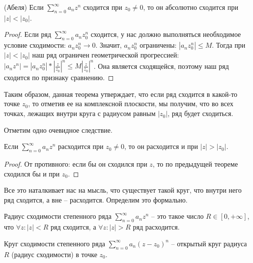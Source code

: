 \vspace*{5mm}

\begin{theorem} (Абеля)
    Если $\sum\limits_{n=0}^\infty a_n z^n$ сходится при $z_0 \neq 0$, то он абсолютно сходится при $|z| < |z_0|$.    
\end{theorem}
\begin{proof}
    Если ряд $\sum\limits_{n=0}^\infty a_n z_0^n$ сходится, у нас должно выполняться необходимое условие сходимости: $a_nz_0^n \to 0$.
    Значит, $a_nz_0^n$ ограничены: $|a_nz_0^n| \leqslant M$. 
    Тогда при $|z| < |z_0|$ наш ряд ограничен геометрической прогрессией: $|a_nz^n| = |a_nz_0^n| * |\frac{z}{z_0}|^n \leqslant M|\frac{z}{z_0}|^n$.
    Она является сходящейся, поэтому наш ряд сходится по признаку сравнению.
\end{proof}

Таким образом, данная теорема утверждает, что если ряд сходится в какой-то точке $z_0$, то отметив ее на комплексной плоскости, мы получим, что во всех точках, лежащих внутри круга с радиусом равным $|z_0|$, ряд будет сходиться.

Отметим одно очевидное следствие.

\begin{follow}
    Если $\sum\limits_{n=0}^\infty a_n z^n$ расходится при $z_0 \neq 0$, то он расходится и при $|z| > |z_0|$.
\end{follow}
\begin{proof}
    От противного: если бы он сходился при $z$, то по предыдущей теореме сходился бы и при $z_0$.
\end{proof}

\vspace*{5mm}

Все это наталкивает нас на мысль, что существует такой круг, что внутри него ряд сходится, а вне -- расходится.
Определим это формально.

\begin{conj}
    Радиус сходимости степенного ряда $\sum\limits_{n=0}^\infty a_n z^n$ -- это такое число $R \in [0, +\infty]$, что $\forall z : |z| < R$ ряд сходится, а $\forall z : |z| > R$ ряд расходится.
\end{conj}

\begin{conj}
    Круг сходимости степенного ряда $\sum\limits_{n=0}^\infty a_n (z - z_0)^n$ -- открытый круг радиуса $R$ (радиус сходимости) в точке $z_0$.
\end{conj}

